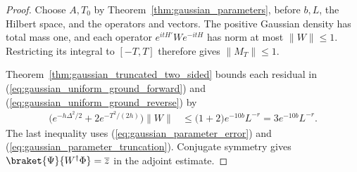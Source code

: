 \begin{proof}\leanok
    Choose $A,T_0$ by Theorem~\ref{thm:gaussian_parameters}, before
    $b,L$, the Hilbert space, and the operators and vectors. The positive
    Gaussian density has total mass one, and each operator
    $e^{itH'}W e^{-itH}$ has norm at most $\|W\|\le1$.
    Restricting its integral to $[-T,T]$ therefore gives $\|M_T\|\le1$.

    Theorem~\ref{thm:gaussian_truncated_two_sided}
    bounds each residual in (\ref{eq:gaussian_uniform_ground_forward}) and
    (\ref{eq:gaussian_uniform_ground_reverse}) by
    \begin{align}
        \bigl(e^{-h\Delta^2/2}+2e^{-T^2/(2h)}\bigr)\|W\|
        &\le \bigl(1+2\bigr)e^{-10b}L^{-r}
         =3e^{-10b}L^{-r}.
        \label{eq:gaussian_uniform_ground_error_sum}
    \end{align}
    The last inequality uses
    (\ref{eq:gaussian_parameter_error}) and
    (\ref{eq:gaussian_parameter_truncation}). Conjugate symmetry gives
    $\braket{\Psi}{W^\dagger\Phi}=\overline z$ in the adjoint estimate.
\end{proof}
